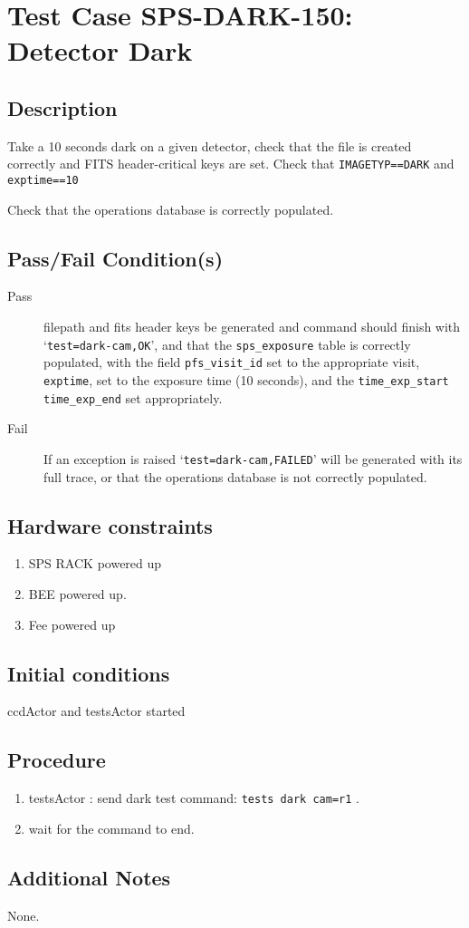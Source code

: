 \section{Test Case SPS-DARK-150: Detector Dark}

\subsection{Description}

Take a 10 seconds dark on a given detector, check that the file is created correctly 
and FITS header-critical keys are set.
Check that \texttt{IMAGETYP==DARK} and \texttt{exptime==10}

Check that the operations database is correctly populated.

\subsection{Pass/Fail Condition(s)}

\begin{description}
\item [Pass] filepath and fits header keys be generated and command should finish with `\texttt{test=dark-cam,OK}', 
and that the \texttt{sps\_exposure} table is correctly populated, 
with the field \texttt{pfs\_visit\_id} set to the appropriate visit, \texttt{exptime}, 
set to the exposure time (10 seconds), and the \texttt{time\_exp\_start} \texttt{time\_exp\_end} set appropriately.

\item [Fail] If an exception is raised `\texttt{test=dark-cam,FAILED}' will be generated with its full trace, 
or that the operations database is not correctly populated.


\end{description}

\subsection{Hardware constraints}

\begin{enumerate}
    \item SPS RACK powered up
    \item \acrshort{BEE} powered up.
    \item Fee powered up
\end{enumerate}

\subsection{Initial conditions}

ccdActor and testsActor started

\subsection{Procedure}

\begin{enumerate}
    \item testsActor : send dark test command: \texttt{tests dark cam=r1} .
    \item wait for the command to end.
\end{enumerate}

\subsection{Additional Notes}
None.

